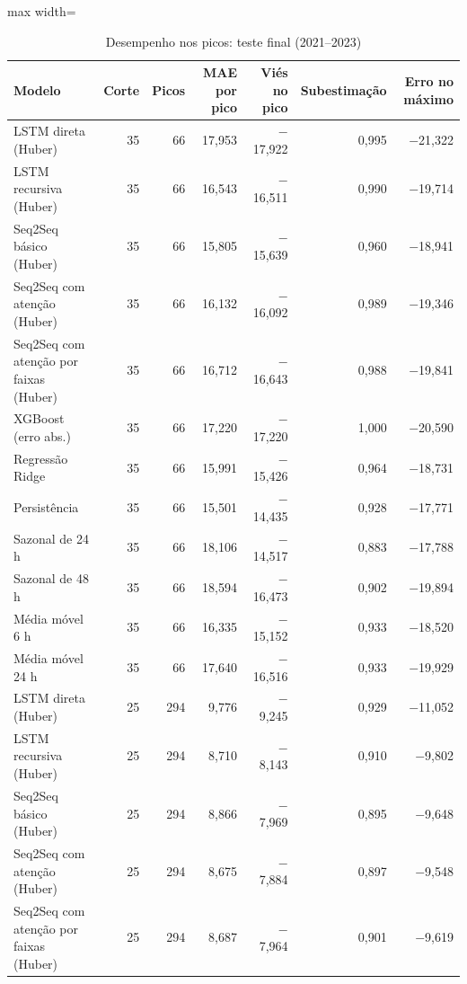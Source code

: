 \begin{table}[!htbp]
    \centering
    \caption{Desempenho nos picos: teste final (2021--2023)}
    \label{tab:eventos_holdout}
    \small
    \begin{adjustbox}{max width=\textwidth}
    \begin{tabular}{lrrrrrr}
        \toprule
        Modelo & Corte & Picos & MAE por pico & Viés no pico & Subestimação & Erro no máximo \\
        \midrule
        LSTM direta (Huber) & 35 & 66 & 17,953 & $-$17,922 & 0,995 & $-$21,322 \\
        LSTM recursiva (Huber) & 35 & 66 & 16,543 & $-$16,511 & 0,990 & $-$19,714 \\
        Seq2Seq básico (Huber) & 35 & 66 & 15,805 & $-$15,639 & 0,960 & $-$18,941 \\
        Seq2Seq com atenção (Huber) & 35 & 66 & 16,132 & $-$16,092 & 0,989 & $-$19,346 \\
        Seq2Seq com atenção por faixas (Huber) & 35 & 66 & 16,712 & $-$16,643 & 0,988 & $-$19,841 \\
        XGBoost (erro abs.) & 35 & 66 & 17,220 & $-$17,220 & 1,000 & $-$20,590 \\
        Regressão Ridge & 35 & 66 & 15,991 & $-$15,426 & 0,964 & $-$18,731 \\
        \midrule
        Persistência & 35 & 66 & 15,501 & $-$14,435 & 0,928 & $-$17,771 \\
        Sazonal de 24 h & 35 & 66 & 18,106 & $-$14,517 & 0,883 & $-$17,788 \\
        Sazonal de 48 h & 35 & 66 & 18,594 & $-$16,473 & 0,902 & $-$19,894 \\
        Média móvel 6 h & 35 & 66 & 16,335 & $-$15,152 & 0,933 & $-$18,520 \\
        Média móvel 24 h & 35 & 66 & 17,640 & $-$16,516 & 0,933 & $-$19,929 \\
        LSTM direta (Huber) & 25 & 294 & 9,776 & $-$9,245 & 0,929 & $-$11,052 \\
        LSTM recursiva (Huber) & 25 & 294 & 8,710 & $-$8,143 & 0,910 & $-$9,802 \\
        Seq2Seq básico (Huber) & 25 & 294 & 8,866 & $-$7,969 & 0,895 & $-$9,648 \\
        Seq2Seq com atenção (Huber) & 25 & 294 & 8,675 & $-$7,884 & 0,897 & $-$9,548 \\
        Seq2Seq com atenção por faixas (Huber) & 25 & 294 & 8,687 & $-$7,964 & 0,901 & $-$9,619 \\

\end{tabular}
\end{adjustbox}
\end{table}
